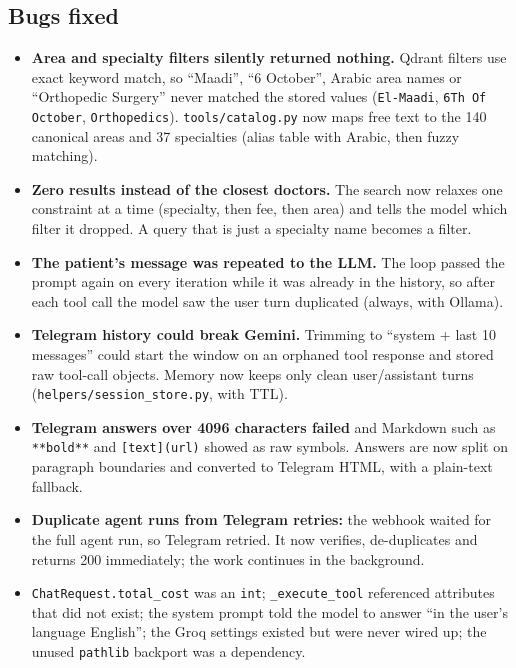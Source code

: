 \documentclass[11pt,a4paper]{article}
\newcommand{\code}[1]{\texttt{#1}}
\begin{document}
\subsection{Bugs fixed}
\begin{itemize}
  \item \textbf{Area and specialty filters silently returned nothing.} Qdrant filters use exact keyword match, so ``Maadi'', ``6 October'', Arabic area names or ``Orthopedic Surgery'' never matched the stored values (\code{El-Maadi}, \code{6Th Of October}, \code{Orthopedics}). \code{tools/catalog.py} now maps free text to the 140 canonical areas and 37 specialties (alias table with Arabic, then fuzzy matching).
  \item \textbf{Zero results instead of the closest doctors.} The search now relaxes one constraint at a time (specialty, then fee, then area) and tells the model which filter it dropped. A query that is just a specialty name becomes a filter.
  \item \textbf{The patient's message was repeated to the LLM.} The loop passed the prompt again on every iteration while it was already in the history, so after each tool call the model saw the user turn duplicated (always, with Ollama).
  \item \textbf{Telegram history could break Gemini.} Trimming to ``system + last 10 messages'' could start the window on an orphaned tool response and stored raw tool-call objects. Memory now keeps only clean user/assistant turns (\code{helpers/session\_store.py}, with TTL).
  \item \textbf{Telegram answers over 4096 characters failed} and Markdown such as \code{**bold**} and \code{[text](url)} showed as raw symbols. Answers are now split on paragraph boundaries and converted to Telegram HTML, with a plain-text fallback.
  \item \textbf{Duplicate agent runs from Telegram retries:} the webhook waited for the full agent run, so Telegram retried. It now verifies, de-duplicates and returns 200 immediately; the work continues in the background.
  \item \code{ChatRequest.total\_cost} was an \code{int}; \code{\_execute\_tool} referenced attributes that did not exist; the system prompt told the model to answer ``in the user's language English''; the Groq settings existed but were never wired up; the unused \code{pathlib} backport was a dependency.
\end{itemize}
\end{document}
